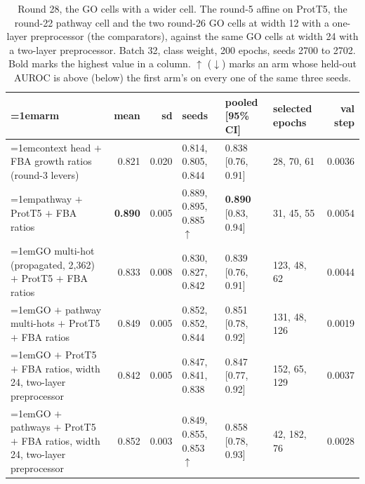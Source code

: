 \begin{table}[H]
  \centering
  \scriptsize
  \setlength{\tabcolsep}{2.5pt}
  \caption[Round 28, the GO cells with a wider cell]{Round 28, the GO cells with a wider cell. The round-5 affine on ProtT5, the round-22 pathway cell and the two round-26 GO cells at width 12 with a one-layer preprocessor (the comparators), against the same GO cells at width 24 with a two-layer preprocessor. Batch 32, class weight, 200 epochs, seeds 2700 to 2702. Bold marks the highest value in a column. $\uparrow$ ($\downarrow$) marks an arm whose held-out AUROC is above (below) the first arm's on every one of the same three seeds.}
  \label{tab:w44}
  \begin{tabular}{@{}>{\raggedright\hangindent=1em\hangafter=1\arraybackslash}p{81.1mm}rrlllr@{}}
    \hline
    arm & mean & sd & seeds & pooled [95\% CI] & selected epochs & val step \\
    \hline
    context head $+$ FBA growth ratios (round-3 levers) & 0.821 & 0.020 & 0.814, 0.805, 0.844 & 0.838 [0.76, 0.91] & 28, 70, 61 & 0.0036 \\
    pathway $+$ ProtT5 $+$ FBA ratios & \textbf{0.890} & 0.005 & 0.889, 0.895, 0.885 $\uparrow$ & \textbf{0.890} [0.83, 0.94] & 31, 45, 55 & 0.0054 \\
    GO multi-hot (propagated, 2,362) $+$ ProtT5 $+$ FBA ratios & 0.833 & 0.008 & 0.830, 0.827, 0.842 & 0.839 [0.76, 0.91] & 123, 48, 62 & 0.0044 \\
    GO $+$ pathway multi-hots $+$ ProtT5 $+$ FBA ratios & 0.849 & 0.005 & 0.852, 0.852, 0.844 & 0.851 [0.78, 0.92] & 131, 48, 126 & 0.0019 \\
    GO $+$ ProtT5 $+$ FBA ratios, width 24, two-layer preprocessor & 0.842 & 0.005 & 0.847, 0.841, 0.838 & 0.847 [0.77, 0.92] & 152, 65, 129 & 0.0037 \\
    GO $+$ pathways $+$ ProtT5 $+$ FBA ratios, width 24, two-layer preprocessor & 0.852 & 0.003 & 0.849, 0.855, 0.853 $\uparrow$ & 0.858 [0.78, 0.93] & 42, 182, 76 & 0.0028 \\
    \hline
  \end{tabular}
\end{table}
